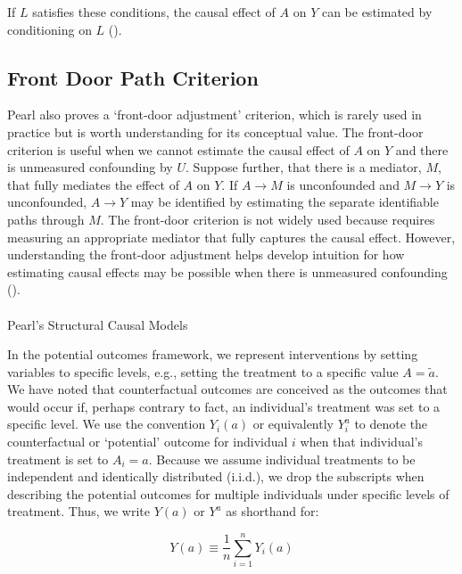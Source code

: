 \documentclass[
  single column]{article}
\makeatletter
\let\oldparagraph\paragraph
\renewcommand{\paragraph}{
    \@ifstar
      \xxxParagraphStar
      \xxxParagraphNoStar
  }
\newcommand{\xxxParagraphStar}[1]{\oldparagraph*{#1}\mbox{}}
\newcommand{\xxxParagraphNoStar}[1]{\oldparagraph{#1}\mbox{}}
\makeatother
\begin{document}
If \(L\) satisfies these conditions, the causal effect of \(A\) on \(Y\)
can be estimated by conditioning on \(\boxed{L}\)
().

\subsection{Front Door Path Criterion}\label{front-door-path-criterion}

Pearl also proves a `front-door adjustment' criterion, which is rarely
used in practice but is worth understanding for its conceptual value.
The front-door criterion is useful when we cannot estimate the causal
effect of \(A\) on \(Y\) and there is unmeasured confounding by \(U\).
Suppose further, that there is a mediator, \(M\), that fully mediates
the effect of \(A\) on \(Y\). If \(A\to M\) is unconfounded and
\(M \to Y\) is unconfounded, \(A \to Y\) may be identified by estimating
the separate identifiable paths through \(M\). The front-door criterion
is not widely used because requires measuring an appropriate mediator
that fully captures the causal effect. However, understanding the
front-door adjustment helps develop intuition for how estimating causal
effects may be possible when there is unmeasured confounding
().

\paragraph{Pearl's Structural Causal
Models}\label{pearls-structural-causal-models}

In the potential outcomes framework, we represent interventions by
setting variables to specific levels, e.g., setting the treatment to a
specific value \(A = \tilde{a}\). We have noted that counterfactual
outcomes are conceived as the outcomes that would occur if, perhaps
contrary to fact, an individual's treatment was set to a specific level.
We use the convention \(Y_i(a)\) or equivalently \(Y_i^{a}\) to denote
the counterfactual or `potential' outcome for individual \(i\) when that
individual's treatment is set to \(A_i = a\). Because we assume
individual treatments to be independent and identically distributed
(i.i.d.), we drop the subscripts when describing the potential outcomes
for multiple individuals under specific levels of treatment. Thus, we
write \(Y(a)\) or \(Y^a\) as shorthand for:

\[
Y(a) \equiv \frac{1}{n} \sum_{i=1}^n Y_i(a)
\]
\end{document}
